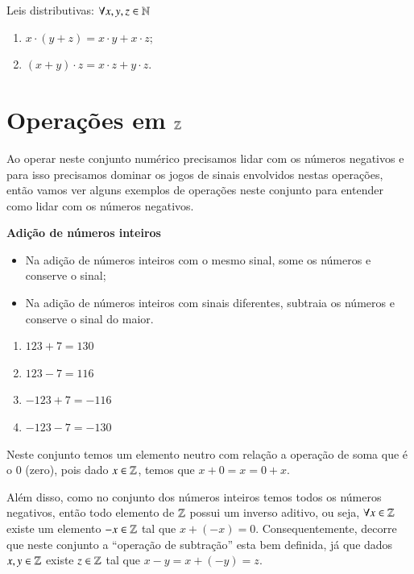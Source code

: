  Leis distributivas: $\forall x, y, z \in \mathbb{N}$
 \begin{enumerate}[1)]
 \item $x \cdot (y + z)= x \cdot y + x \cdot z$;
 \item $(x + y) \cdot z= x \cdot z + y \cdot z$.
 \end{enumerate}

 \section{Operações em \texorpdfstring{$\mathbb{Z}$}{Z}}

 Ao operar neste conjunto numérico precisamos lidar com os números negativos e para isso precisamos dominar os jogos de sinais envolvidos nestas operações, então vamos ver alguns exemplos de operações neste conjunto para entender como lidar com os números negativos.

   \vskip0.3cm
   
 \textbf{Adição de números inteiros}

 \begin{itemize}
  \item Na adição de números inteiros com o mesmo sinal, some os números e conserve o sinal;
  \item Na adição de números inteiros com sinais diferentes, subtraia os números e conserve o sinal do maior.
 \end{itemize}

  \begin{enumerate}[1)]
   \item $123 + 7= 130$
   \item $123 - 7= 116$
   \item $-123 + 7 = -116$
   \item $-123 - 7 = -130$
 \end{enumerate}
 
  Neste conjunto temos um elemento neutro com relação a operação de soma que é o $0$ (zero), pois dado $x \in \mathbb{Z}$, temos que $x+0=x=0+x$.
 
 Além disso, como no conjunto dos números inteiros temos todos os números negativos, então todo elemento de $\mathbb{Z}$ possui um inverso aditivo, ou seja, $\forall x \in \mathbb{Z}$ existe um elemento $-x \in \mathbb{Z}$ tal que $x + (-x)=0$. Consequentemente, decorre que neste conjunto a ``operação de subtração'' esta bem definida, já que dados $x, y \in \mathbb{Z}$ existe $z \in \mathbb{Z}$ tal que $x - y= x+ (-y)= z$.

   \vskip0.3cm
  
